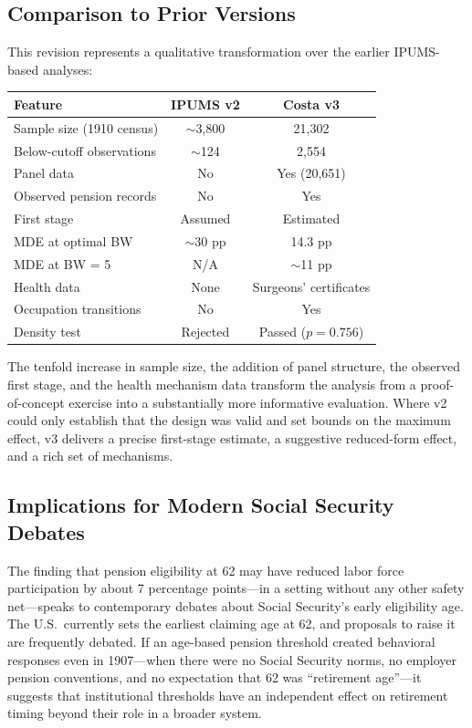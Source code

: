 \documentclass[12pt]{article}
\begin{document}
\subsection{Comparison to Prior Versions}

This revision represents a qualitative transformation over the earlier IPUMS-based analyses:

\begin{center}
\begin{tabular}{lcc}
\toprule
Feature & IPUMS v2 & Costa v3 \\
\midrule
Sample size (1910 census) & $\sim$3,800 & 21,302 \\
Below-cutoff observations & $\sim$124 & 2,554 \\
Panel data & No & Yes (20,651) \\
Observed pension records & No & Yes \\
First stage & Assumed & Estimated \\
MDE at optimal BW & $\sim$30 pp & 14.3 pp \\
MDE at BW = 5 & N/A & $\sim$11 pp \\
Health data & None & Surgeons' certificates \\
Occupation transitions & No & Yes \\
Density test & Rejected & Passed ($p = 0.756$) \\
\bottomrule
\end{tabular}
\end{center}

The tenfold increase in sample size, the addition of panel structure, the observed first stage, and the health mechanism data transform the analysis from a proof-of-concept exercise into a substantially more informative evaluation. Where v2 could only establish that the design was valid and set bounds on the maximum effect, v3 delivers a precise first-stage estimate, a suggestive reduced-form effect, and a rich set of mechanisms.

\subsection{Implications for Modern Social Security Debates}

The finding that pension eligibility at 62 may have reduced labor force participation by about 7 percentage points---in a setting without any other safety net---speaks to contemporary debates about Social Security's early eligibility age. The U.S.\ currently sets the earliest claiming age at 62, and proposals to raise it are frequently debated. If an age-based pension threshold created behavioral responses even in 1907---when there were no Social Security norms, no employer pension conventions, and no expectation that 62 was ``retirement age''---it suggests that institutional thresholds have an independent effect on retirement timing beyond their role in a broader system.
\end{document}
